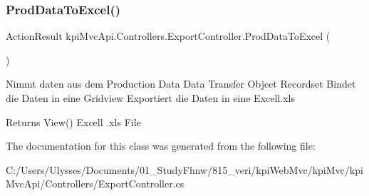 \subsubsection{\texorpdfstring{Prod\+Data\+To\+Excel()}{ProdDataToExcel()}\hspace{0.1cm}{\footnotesize\ttfamily [2/2]}}
{\footnotesize\ttfamily Action\+Result kpi\+Mvc\+Api.\+Controllers.\+Export\+Controller.\+Prod\+Data\+To\+Excel (\begin{DoxyParamCaption}{ }\end{DoxyParamCaption})\hspace{0.3cm}{\ttfamily [inline]}}



Nimmt daten aus dem Production Data Data Transfer Object Recordset Bindet die Daten in eine Gridview Exportiert die Daten in eine Excell.\+xls 

\begin{DoxyReturn}{Returns}
View() Excell .xls File 
\end{DoxyReturn}


The documentation for this class was generated from the following file\+:\begin{DoxyCompactItemize}
\item 
C\+:/\+Users/\+Ulysses/\+Documents/01\+\_\+\+Study\+Fhnw/815\+\_\+veri/kpi\+Web\+Mvc/kpi\+Mvc/kpi\+Mvc\+Api/\+Controllers/Export\+Controller.\+cs\end{DoxyCompactItemize}
